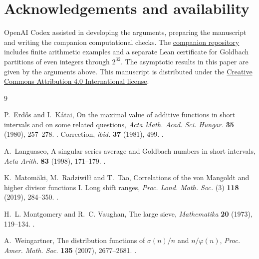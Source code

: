 \section*{Acknowledgements and availability}

OpenAI Codex assisted in developing the arguments, preparing the manuscript
and writing the companion computational checks. The
\href{https://github.com/deltavra/goldbach-representations}{companion repository}
includes finite arithmetic examples and a separate Lean certificate for
Goldbach partitions of even integers through \(2^{32}\). The
asymptotic results in this paper are given by the arguments above.
This manuscript is distributed under the
\href{https://creativecommons.org/licenses/by/4.0/}{Creative Commons
Attribution 4.0 International license}.

\begin{thebibliography}{9}

P.~Erd\H{o}s and I.~K\'atai,
On the maximal value of additive functions in short intervals and on some
related questions,
\emph{Acta Math. Acad. Sci. Hungar.} \textbf{35} (1980), 257--278.
.
Correction, \emph{ibid.} \textbf{37} (1981), 499.
.

A.~Languasco, A singular series average and Goldbach numbers in short
intervals, \emph{Acta Arith.} \textbf{83} (1998), 171--179.
.

K.~Matom\"aki, M.~Radziwi{\l}{\l} and T.~Tao,
Correlations of the von Mangoldt and higher divisor functions I. Long shift
ranges, \emph{Proc. Lond. Math. Soc.} (3) \textbf{118} (2019), 284--350.
.

H.~L. Montgomery and R.~C. Vaughan, The large sieve,
\emph{Mathematika} \textbf{20} (1973), 119--134.
.

A.~Weingartner, The distribution functions of \(\sigma(n)/n\) and
\(n/\varphi(n)\), \emph{Proc. Amer. Math. Soc.} \textbf{135} (2007),
2677--2681. .

\end{thebibliography}
